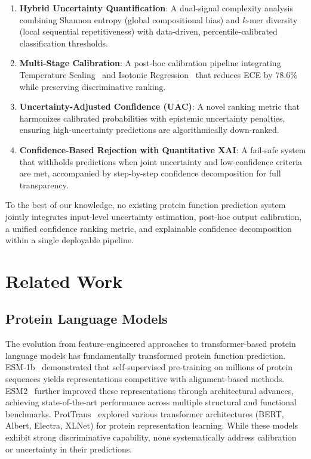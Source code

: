 \documentclass[conference]{IEEEtran}
\begin{document}
\begin{enumerate}
    \item \textbf{Hybrid Uncertainty Quantification}: A dual-signal complexity analysis combining Shannon entropy (global compositional bias) and $k$-mer diversity (local sequential repetitiveness) with data-driven, percentile-calibrated classification thresholds.
    \item \textbf{Multi-Stage Calibration}: A post-hoc calibration pipeline integrating Temperature Scaling~\cite{guo2017} and Isotonic Regression~\cite{zadrozny2002} that reduces ECE by 78.6\% while preserving discriminative ranking.
    \item \textbf{Uncertainty-Adjusted Confidence (UAC)}: A novel ranking metric that harmonizes calibrated probabilities with epistemic uncertainty penalties, ensuring high-uncertainty predictions are algorithmically down-ranked.
    \item \textbf{Confidence-Based Rejection with Quantitative XAI}: A fail-safe system that withholds predictions when joint uncertainty and low-confidence criteria are met, accompanied by step-by-step confidence decomposition for full transparency.
\end{enumerate}

To the best of our knowledge, no existing protein function prediction system jointly integrates input-level uncertainty estimation, post-hoc output calibration, a unified confidence ranking metric, and explainable confidence decomposition within a single deployable pipeline.

\section{Related Work}

\subsection{Protein Language Models}
The evolution from feature-engineered approaches to transformer-based protein language models has fundamentally transformed protein function prediction. ESM-1b~\cite{rives2021} demonstrated that self-supervised pre-training on millions of protein sequences yields representations competitive with alignment-based methods. ESM2~\cite{lin2023} further improved these representations through architectural advances, achieving state-of-the-art performance across multiple structural and functional benchmarks. ProtTrans~\cite{elnaggar2021} explored various transformer architectures (BERT, Albert, Electra, XLNet) for protein representation learning. While these models exhibit strong discriminative capability, none systematically address calibration or uncertainty in their predictions.
\end{document}
